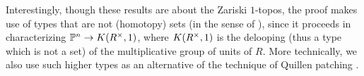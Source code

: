 Interestingly, though these results are
about the Zariski $1$-topos, the proof makes use of types that
are not (homotopy) sets (in the sense of \cite{hott}),
since it proceeds in characterizing $\mathbb{P}^n\rightarrow K(R^{\times},1)$, where $K(R^{\times},1)$ is the delooping
(thus a type which is not a set) of the multiplicative group of units of $R$.
More technically, we also use such higher types as an alternative of the technique
of Quillen patching \cite{Quillen,lombardi-quitte,Lam}.













